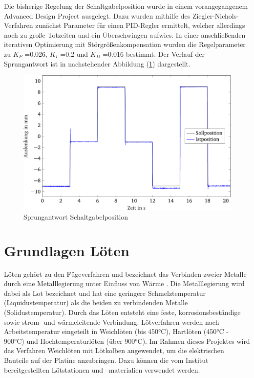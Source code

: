 Die bisherige Regelung der Schaltgabelposition wurde in einem vorangegangenem Advanced Design Project ausgelegt. Dazu wurden mithilfe des Ziegler-Nichols-Verfahren zunächst Parameter für einen PID-Regler ermittelt, welcher allerdings noch zu große Totzeiten und ein Überschwingen aufwies. In einer anschließenden iterativen Optimierung mit Störgrößenkompensation wurden die Regelparameter zu $K_P$ =\SI{0,026}{}, $K_I$ =\SI{0,2}{} und $K_D$ =\SI{0,016}{} bestimmt. Der Verlauf der Sprungantwort ist in nachstehender Abbildung (\ref{fig:Sprungantwort Schaltgabelposition}) dargestellt.
\begin{figure}[h]
	\centering
		\includegraphics{Bilder/SprungantwortSchaltgabelposition.pdf}
	\caption{Sprungantwort Schaltgabelposition \cite[S.35]{adp}}
	\label{fig:Sprungantwort Schaltgabelposition}
\end{figure}

\section{Grundlagen Löten}
Löten gehört zu den Fügeverfahren und bezeichnet das Verbinden zweier Metalle durch eine Metalllegierung unter Einfluss von Wärme \cite{loeten}. Die Metalllegierung wird dabei als Lot bezeichnet und hat eine geringere Schmelztemperatur (Liquidustemperatur) als die beiden zu verbindenden Metalle (Solidustemperatur). Durch das Löten entsteht eine feste, korrosionsbeständige sowie strom- und wärmeleitende Verbindung. Lötverfahren werden nach Arbeitstemperatur eingeteilt in Weichlöten (bis 450°C), Hartlöten (450°C - 900°C) und Hochtemperaturlöten (über 900°C). Im Rahmen dieses Projektes wird das Verfahren Weichlöten mit Lötkolben angewendet, um die elektrischen Bauteile auf der Platine anzubringen. Dazu können die vom Institut bereitgestellten Lötstationen und –materialien verwendet werden. 

